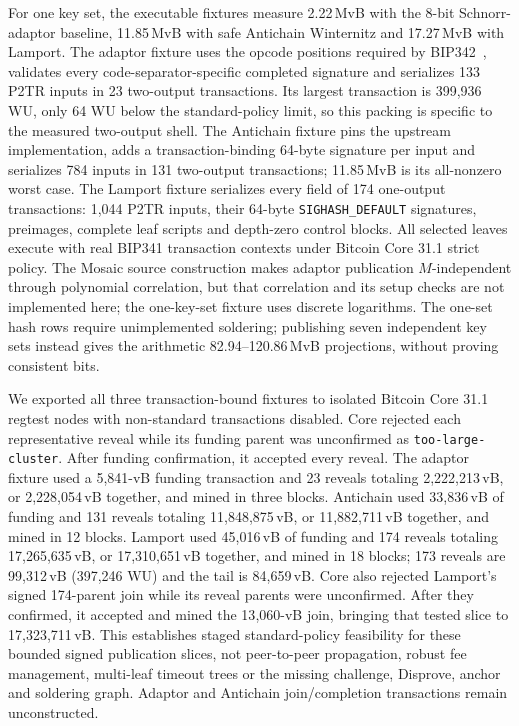 \documentclass[11pt]{article}
\begin{document}
For one key set, the executable fixtures measure 2.22\,MvB with the 8-bit
Schnorr-adaptor baseline, 11.85\,MvB with safe Antichain Winternitz and 17.27\,MvB with
Lamport. The adaptor fixture uses the opcode positions required by
BIP342~\cite{bip342}, validates every code-separator-specific completed
signature and serializes 133 P2TR inputs in 23 two-output transactions. Its
largest transaction is 399{,}936 WU, only 64 WU below the standard-policy
limit, so this packing is specific to the measured two-output shell. The
Antichain fixture pins the upstream implementation, adds a transaction-binding
64-byte signature per input and serializes 784 inputs in 131 two-output
transactions; 11.85\,MvB is its all-nonzero worst case. The Lamport fixture
serializes every field of 174 one-output transactions: 1{,}044 P2TR inputs,
their 64-byte \texttt{SIGHASH\_DEFAULT} signatures, preimages, complete leaf
scripts and depth-zero control blocks. All selected leaves execute with real
BIP341 transaction contexts under Bitcoin Core 31.1 strict policy. The
Mosaic source construction makes adaptor publication $M$-independent through
polynomial correlation, but that correlation and its setup checks are not
implemented here; the one-key-set fixture uses discrete logarithms. The
one-set hash rows require unimplemented soldering;
publishing seven independent key sets instead gives the arithmetic
82.94--120.86\,MvB projections, without proving consistent bits.

We exported all three transaction-bound fixtures to isolated Bitcoin Core 31.1
regtest nodes with non-standard transactions disabled. Core rejected each
representative reveal while its funding parent was unconfirmed as
\texttt{too-large-cluster}. After funding confirmation, it accepted every
reveal. The adaptor fixture used a 5{,}841-vB funding transaction and 23 reveals
totaling 2{,}222{,}213\,vB, or 2{,}228{,}054\,vB together, and mined in three
blocks. Antichain used 33{,}836\,vB of funding and 131 reveals totaling
11{,}848{,}875\,vB, or 11{,}882{,}711\,vB together, and mined in 12 blocks.
Lamport used 45{,}016\,vB of funding and 174 reveals totaling
17{,}265{,}635\,vB, or 17{,}310{,}651\,vB together, and mined in 18 blocks; 173
reveals are 99{,}312\,vB (397{,}246 WU) and the tail is 84{,}659\,vB. Core also
rejected Lamport's signed 174-parent join while its reveal parents were
unconfirmed. After they confirmed, it accepted and mined the 13{,}060-vB join,
bringing that tested slice to 17{,}323{,}711\,vB. This establishes staged
standard-policy feasibility for these bounded signed publication slices, not
peer-to-peer propagation, robust fee management, multi-leaf timeout trees or
the missing challenge, Disprove, anchor and soldering graph. Adaptor and
Antichain join/completion transactions remain unconstructed.
\end{document}
